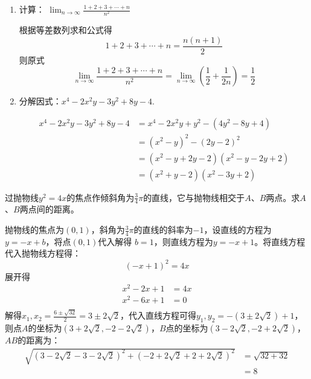 \documentclass[answers]{exam}
\begin{document}
\begin{questions}
\begin{enumerate}[label=(\arabic*)]
\begin{solution}
		      \end{solution}
		\item 计算： \( \displaystyle \lim_{n\to\infty}\frac{1+2+3+\cdots+n}{n^2} \)
		      \begin{solution}
			      根据等差数列求和公式得
			      \begin{equation*}
				      1 + 2 + 3 + \cdots + n = \frac{n(n+1)}{2}
			      \end{equation*}
			      则原式
			      \begin{equation*}
				      \lim_{n\to\infty}\frac{1+2+3+\cdots+n}{n^2} = \lim_{n\to\infty}(\frac12 + \frac{1}{2n}) = \frac12
			      \end{equation*}
		      \end{solution}
		\item 分解因式：$ x^4 - 2x^2y - 3y^2 + 8y - 4 $.
		      \begin{solution}
			      \begin{align*}
				      x^4 - 2x^2y - 3y^2 + 8y - 4 & = x^4 - 2x^2y + y^2 - (4y^2 - 8y + 4)  \\
				                                  & = (x^2 - y)^2 - (2y - 2)^2             \\
				                                  & = (x^2 - y + 2y - 2)(x^2 - y - 2y + 2) \\
				                                  & = (x^2 + y - 2)(x^2 - 3y + 2)
			      \end{align*}
		      \end{solution}
	\end{enumerate}
	\question 过抛物线$ y^2 = 4x
	$的焦点作倾斜角为$\frac34\pi$的直线，它与抛物线相交于$A$、$B$两点。求$A$、$B$两点间的距离。
	\begin{solution}
		抛物线的焦点为$(0,1)$，斜角为$\frac34\pi$的直线的斜率为$-1$，设直线的方程为$ y = -x + b $，将点$(0,1)$代入解得
		$b = 1$，则直线方程为$ y=-x+1 $。将直线方程代入抛物线方程得：
		\begin{equation*}
			(-x + 1)^2 = 4x
		\end{equation*}
		展开得
		\begin{align*}
			x^2 - 2x + 1 & = 4x \\
			x^2 -6x + 1  & = 0  \\
		\end{align*}
		解得$ x_1,x_2 = \frac{6 \pm \sqrt{32}}{2} = 3 \pm 2\sqrt{2} $，代入直线方程可得$ y_1,y_2 = -(3\pm2\sqrt{2}) +
			1$，则点$A$的坐标为$(3+2\sqrt{2}, -2 - 2\sqrt{2})$，$B$点的坐标为$(3-2\sqrt{2}, -2 + 2\sqrt{2})$，$AB$的距离为：
		\begin{align*}
			\sqrt{(3-2\sqrt{2} - 3 - 2\sqrt{2})^2 + (-2 + 2\sqrt{2} + 2 + 2\sqrt{2})^2}
			 & = \sqrt{32 + 32} \\
			 & = 8
		\end{align*}
	\end{solution}
\end{questions}
\end{document}
